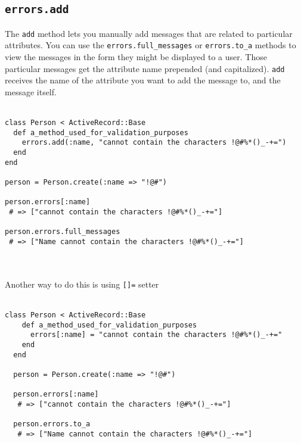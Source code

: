 \documentclass[10pt]{book}
\begin{document}
\subsection{ \texttt{errors.add}}

The \texttt{add} method lets you manually add messages that are related to particular attributes. You can use the \texttt{errors.full\_messages} or \texttt{errors.to\_a}  methods to view the messages in the form they might be displayed to a  user. Those particular messages get the attribute name prepended (and  capitalized). \texttt{add} receives the name of the attribute you want to add the message to, and the message itself.
\\ \\
\begin{minipage}{\textwidth}{\scriptsize
\begin{verbatim}
class Person < ActiveRecord::Base
  def a_method_used_for_validation_purposes
    errors.add(:name, "cannot contain the characters !@#%*()_-+=")
  end
end
 
person = Person.create(:name => "!@#")
 
person.errors[:name]
 # => ["cannot contain the characters !@#%*()_-+="]
 
person.errors.full_messages
 # => ["Name cannot contain the characters !@#%*()_-+="]
\end{verbatim}}
\end{minipage}
\\ \\

Another way to do this is using \texttt{[]=} setter
\\ \\
\begin{minipage}{\textwidth}{\scriptsize
\begin{verbatim}
class Person < ActiveRecord::Base
    def a_method_used_for_validation_purposes
      errors[:name] = "cannot contain the characters !@#%*()_-+="
    end
  end
 
  person = Person.create(:name => "!@#")
 
  person.errors[:name]
   # => ["cannot contain the characters !@#%*()_-+="]
 
  person.errors.to_a
   # => ["Name cannot contain the characters !@#%*()_-+="]
\end{verbatim}}
\end{minipage}
\\ \\
\end{document}
